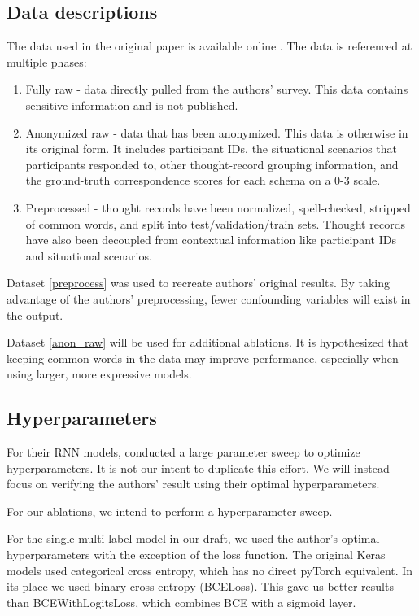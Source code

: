 \documentclass[11pt,a4paper]{article}
\begin{document}
\subsection{Data descriptions}
The data used in the original paper is available online \citep{burger_2021_data}. The data is referenced at multiple phases: 
\begin{enumerate}
    \item Fully raw - data directly pulled from the authors' survey. This data contains sensitive information and is not published. 
    \item Anonymized raw - data that has been anonymized. This data is otherwise in its original form. It includes participant IDs, the situational scenarios that participants responded to, other thought-record grouping information, and the ground-truth correspondence scores for each schema on a 0-3 scale.
    \label{anon_raw}
    \item Preprocessed - thought records have been normalized, spell-checked, stripped of common words, and split into test/validation/train sets. Thought records have also been decoupled from contextual information like participant IDs and situational scenarios.
    \label{preprocess}
\end{enumerate}

Dataset \ref{preprocess} was used to recreate authors' original results. By taking advantage of the authors' preprocessing, fewer confounding variables will exist in the output. 

Dataset \ref{anon_raw} will be used for additional ablations. It is hypothesized that keeping common words in the data may improve performance, especially when using larger, more expressive models. 

\subsection{Hyperparameters}
For their RNN models, \citeauthor{burger_2021} conducted a large parameter sweep to optimize hyperparameters. It is not our intent to duplicate this effort. We will instead focus on verifying the authors' result using their optimal hyperparameters.

For our ablations, we intend to perform a hyperparameter sweep. 

For the single multi-label model in our draft, we used the author's optimal hyperparameters with the exception of the loss function. The original Keras models used categorical cross entropy, which has no direct pyTorch equivalent. In its place we used binary cross entropy (BCELoss). This gave us better results than BCEWithLogitsLoss, which combines BCE with a sigmoid layer.
\end{document}
